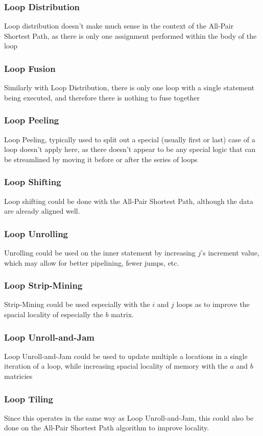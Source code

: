 \documentclass[titlepage]{article}
\begin{document}
\subsubsection*{Loop Distribution}
Loop distribution doesn't make much sense in the context of the All-Pair Shortest Path, as there is only
one assignment performed within the body of the loop
\subsubsection*{Loop Fusion}
Similarly with Loop Distribution, there is only one loop with a single statement being executed, and therefore
there is nothing to fuse together
\subsubsection*{Loop Peeling}
Loop Peeling, typically used to split out a special (usually first or last) case of a loop doesn't apply here,
as there doesn't appear to be any special logic that can be streamlined by moving it before or after the
series of loops
\subsubsection*{Loop Shifting}
Loop shifting could be done with the All-Pair Shortest Path, although the data are already aligned well.
\subsubsection*{Loop Unrolling}
Unrolling could be used on the inner statement by increasing $j$'s increment value, which may allow for
better pipelining, fewer jumps, etc.
\subsubsection*{Loop Strip-Mining}
Strip-Mining could be used especially with the $i$ and $j$ loops as to improve the spacial locality of
especially the $b$ matrix.
\subsubsection*{Loop Unroll-and-Jam}
Loop Unroll-and-Jam could be used to update multiple a locations in a single iteration of a loop, while
increasing spacial locality of memory with the $a$ and $b$ matricies
\subsubsection*{Loop Tiling}
Since this operates in the same way as Loop Unroll-and-Jam, this could also be done on the All-Pair Shortest
Path algorithm to improve locality.
\end{document}
